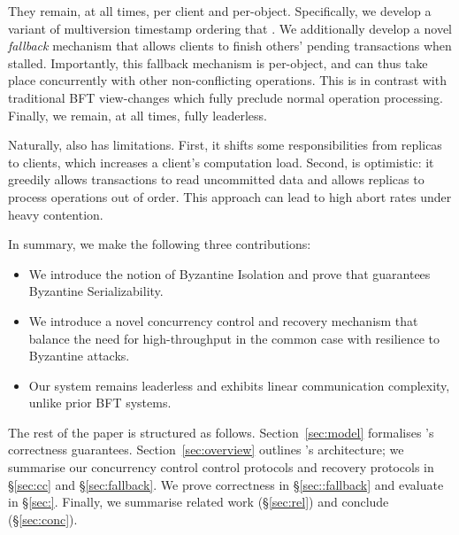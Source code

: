 They remain, at all times, per client and per-object. Specifically, we develop a variant of multiversion timestamp ordering that . 
 We additionally develop a novel \textit{fallback} mechanism that allows clients to finish others' pending transactions when stalled. Importantly, this fallback mechanism is per-object, and can thus take place concurrently with other non-conflicting operations. This is in contrast with traditional BFT view-changes which fully preclude normal operation processing.  Finally, we remain, at all times, fully leaderless. 

Naturally, \sys{} also has limitations. First, it shifts some
responsibilities from replicas to clients, which increases a client's computation load. Second, \sys{} is optimistic: it greedily allows transactions to read uncommitted data and allows replicas to process operations out of order. This approach can lead to high abort rates under heavy contention.

In summary, we make the following three contributions: 
\begin{itemize}
\item We introduce the notion of Byzantine Isolation and prove that \sys guarantees
Byzantine Serializability.
\item We introduce a novel concurrency control and recovery  mechanism that balance the need for high-throughput in
the common case with resilience to Byzantine attacks.
\item Our system remains leaderless and exhibits linear communication complexity, unlike prior BFT systems. 
\end{itemize}


The rest of the paper is structured as follows. Section~\ref{sec:model} formalises \sys{}'s correctness guarantees.
Section~\ref{sec:overview} outlines
\sys's architecture; we summarise our concurrency control control protocols and recovery protocols in \S\ref{sec:cc} and \S\ref{sec:fallback}. We
prove correctness in \S\ref{sec::fallback} and evaluate \sys in \S\ref{sec:}. Finally, we summarise related work (\S\ref{sec:rel}) and conclude (\S\ref{sec:conc}).

